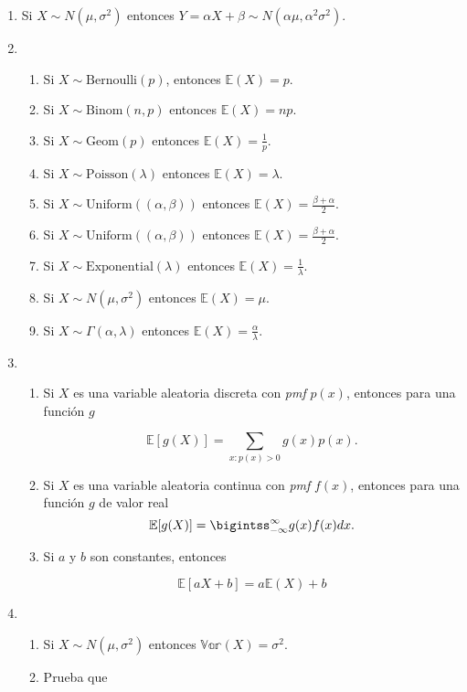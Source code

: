 \documentclass[a4paper,11pt]{report}
\begin{document}
\begin{enumerate}
\item Si $X \sim N(\mu, \sigma^2)$ entonces $Y = \alpha X + \beta \sim N(\alpha \mu , \alpha^2\sigma^2)$.
\item 

\begin{enumerate}
	\item Si  $X \sim \text{Bernoulli}(p)$, entonces  $\mathbb{E}(X) = p$.
	\item Si  $X \sim \text{Binom}(n,p )$ entonces $\mathbb{E}(X) = np$.
	\item Si $X \sim \text{Geom}(p)$ entonces  $\mathbb{E}(X) = \frac{1}{p}$.
	\item Si  $X \sim \text{Poisson}(\lambda)$ entonces $\mathbb{E}(X) = \lambda$.
	\item Si $X \sim \text{Uniform}((\alpha, \beta))$ entonces $\mathbb{E}(X) = \frac{\beta + \alpha}{2}$.
	\item Si $X \sim \text{Uniform}((\alpha, \beta))$ entonces $\mathbb{E}(X) = \frac{\beta + \alpha}{2}$.
	\item Si $X \sim \text{Exponential}(\lambda )$ entonces $\mathbb{E}(X) = \frac{1}{\lambda}$.
	\item Si $X \sim N(\mu, \sigma^2)$ entonces  $\mathbb{E}(X) = \mu$.
	\item Si  $X \sim \Gamma(\alpha, \lambda)$ entonces $\mathbb{E}(X) = \frac{\alpha}{\lambda}$.
\end{enumerate}
\item 

\begin{enumerate}
	\item Si $X$ es una variable aleatoria discreta con \textit{pmf} $p(x)$, entonces para una funci\'on $g$
	
	\[
	\mathbb{E}[g(X)] = \sum_{x:p(x) > 0}g(x)p(x).
	\]
\item Si $X$ es una variable aleatoria continua con \textit{pmf} $f(x)$, entonces para una funci\'on $g$ de valor real
\[
\mathbb{E}[g(X)] = \bigintss_{-\infty}^{\infty}g(x)f(x) dx.
\]
	\item Si $a$ y $b$ son constantes, entonces
	
	\[
	\mathbb{E}[aX + b] = a\mathbb{E}(X)  + b
	\]
\end{enumerate}
\item

\begin{enumerate}
\item  Si $X \sim N(\mu, \sigma^2)$ entonces $\mathbb{Var}(X) = \sigma^2$.
\item Prueba que 


\end{enumerate}
\end{enumerate}
\end{document}
